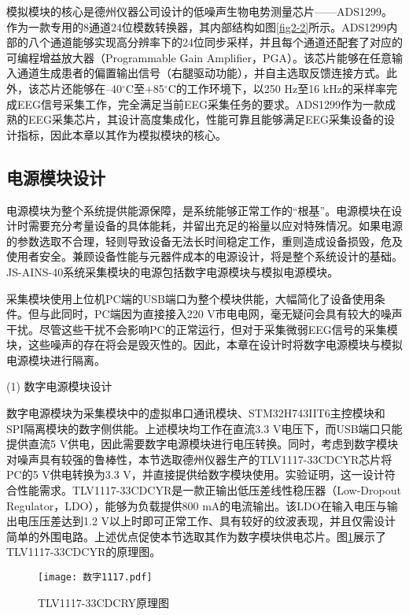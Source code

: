 模拟模块的核心是德州仪器公司设计的低噪声生物电势测量芯片——ADS1299。作为一款专用的8通道24位模数转换器，其内部结构如图\ref{fig2-2}所示。ADS1299内部的八个通道能够实现高分辨率下的24位同步采样，并且每个通道还配套了对应的可编程增益放大器（Programmable Gain Amplifier，PGA）。该芯片能够在任意输入通道生成患者的偏置输出信号（右腿驱动功能），并自主选取反馈连接方式。此外，该芯片还能够在–40$^{\circ}$C至+85$^{\circ}$C的工作环境下，以250 Hz至16 kHz的采样率完成EEG信号采集工作，完全满足当前EEG采集任务的要求。ADS1299作为一款成熟的EEG采集芯片，其设计高度集成化，性能可靠且能够满足EEG采集设备的设计指标，因此本章以其作为模拟模块的核心。

\subsection{电源模块设计}

电源模块为整个系统提供能源保障，是系统能够正常工作的“根基”。电源模块在设计时需要充分考量设备的具体能耗，并留出充足的裕量以应对特殊情况。如果电源的参数选取不合理，轻则导致设备无法长时间稳定工作，重则造成设备损毁，危及使用者安全。兼顾设备性能与元器件成本的电源设计，将是整个系统设计的基础。JS-AINS-40系统采集模块的电源包括数字电源模块与模拟电源模块。

采集模块使用上位机PC端的USB端口为整个模块供能，大幅简化了设备使用条件。但与此同时，PC端因为直接接入220 V市电电网，毫无疑问会具有较大的噪声干扰。尽管这些干扰不会影响PC的正常运行，但对于采集微弱EEG信号的采集模块，这些噪声的存在将会是毁灭性的。因此，本章在设计时将数字电源模块与模拟电源模块进行隔离。

(1) 数字电源模块设计

数字电源模块为采集模块中的虚拟串口通讯模块、STM32H743IIT6主控模块和SPI隔离模块的数字侧供能。上述模块均工作在直流3.3 V电压下，而USB端口只能提供直流5 V供电，因此需要数字电源模块进行电压转换。同时，考虑到数字模块对噪声具有较强的鲁棒性，本节选取德州仪器生产的TLV1117-33CDCYR芯片将PC的5 V供电转换为3.3 V，并直接提供给数字模块使用。实验证明，这一设计符合性能需求。TLV1117-33CDCYR是一款正输出低压差线性稳压器（Low-Dropout Regulator，LDO），能够为负载提供800 mA的电流输出。该LDO在输入电压与输出电压压差达到1.2 V以上时即可正常工作、具有较好的纹波表现，并且仅需设计简单的外围电路。上述优点促使本节选取其作为数字模块供电芯片。图\ref{fig2-5}展示了TLV1117-33CDCYR的原理图。

\begin{figure}[!h]
	\centering
	\texttt{[image: 数字1117.pdf]}
	\caption{TLV1117-33CDCRY原理图}
	\label{fig2-5}
\end{figure}

